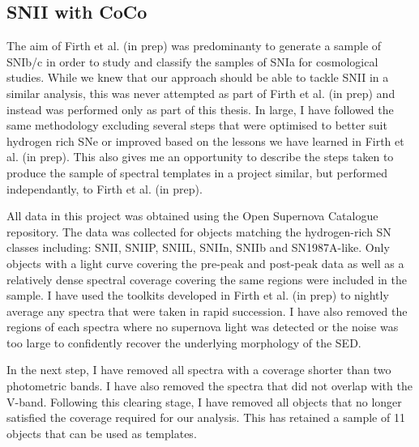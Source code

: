 \subsection{SNII with CoCo}
The aim of Firth et al. (in prep) was predominanty to generate a sample of SNIb/c in order to study and classify the samples of SNIa for cosmological studies. While we knew that our approach should be able to tackle SNII in a similar analysis, this was never attempted as part of Firth et al. (in prep) and instead was performed only as part of this thesis. In large, I have followed the same methodology excluding several steps that were optimised to better suit hydrogen rich SNe or improved based on the lessons we have learned in Firth et al. (in prep). This also gives me an opportunity to describe the steps taken to produce the sample of spectral templates in a project similar, but performed independantly, to Firth et al. (in prep).

All data in this project was obtained using the Open Supernova Catalogue repository. The data was collected for objects matching the hydrogen-rich SN classes including: SNII, SNIIP, SNIIL, SNIIn, SNIIb and SN1987A-like. Only objects with a light curve covering the pre-peak and post-peak data as well as a relatively dense spectral coverage covering the same regions were included in the sample. I have used the toolkits developed in Firth et al. (in prep) to nightly average any spectra that were taken in rapid succession. I have also removed the regions of each spectra where no supernova light was detected or the noise was too large to confidently recover the underlying morphology of the SED.

In the next step, I have removed all spectra with a coverage shorter than two photometric bands. I have also removed the spectra that did not overlap with the V-band. Following this clearing stage, I have removed all objects that no longer satisfied the coverage required for our analysis. This has retained a sample of 11 objects that can be used as templates.


